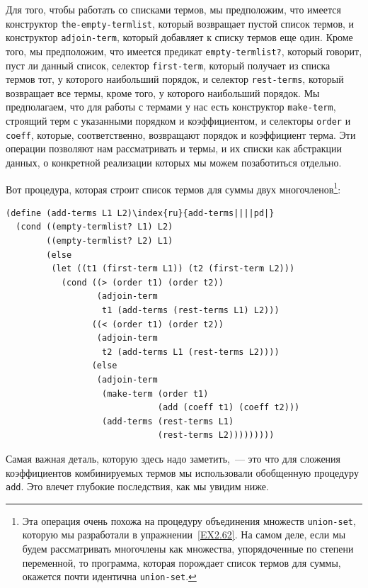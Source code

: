 Для того, чтобы работать со списками термов, мы
предположим, что имеется конструктор {\tt the-empty-termlist},
который возвращает пустой список термов, и конструктор
{\tt adjoin-term}, который добавляет к списку термов еще один.
Кроме того, мы предположим, что имеется предикат {\tt empty-termlist?},
который говорит, пуст ли данный список,
селектор {\tt first-term}, 
который получает из списка термов
тот, у которого наибольший порядок, и селектор
{\tt rest-terms}, 
который возвращает все термы, кроме того, у
которого наибольший порядок.  Мы предполагаем, что для работы с термами
у нас есть конструктор {\tt make-term}, 
строящий терм с
указанными порядком и коэффициентом, и селекторы {\tt order} 
и {\tt coeff}, 
которые, соответственно, возвращают порядок и
коэффициент терма.  Эти операции позволяют нам рассматривать и термы,
и их списки как абстракции данных, о конкретной реализации которых мы
можем позаботиться отдельно.

Вот процедура, которая строит список термов для суммы
двух многочленов\footnote{Эта операция очень похожа на процедуру
объединения множеств {\tt union-set}, которую мы разработали в
упражнении~\ref{EX2.62}.  На самом деле, если мы будем
рассматривать многочлены как множества, упорядоченные по степени
переменной, то программа, которая порождает список термов для суммы,
окажется почти идентична {\tt union-set}.}:

\begin{Verbatim}[fontsize=\small]
(define (add-terms L1 L2)\index{ru}{add-terms||||pd|}
  (cond ((empty-termlist? L1) L2)
        ((empty-termlist? L2) L1)
        (else
         (let ((t1 (first-term L1)) (t2 (first-term L2)))
           (cond ((> (order t1) (order t2))
                  (adjoin-term
                   t1 (add-terms (rest-terms L1) L2)))
                 ((< (order t1) (order t2))
                  (adjoin-term
                   t2 (add-terms L1 (rest-terms L2))))
                 (else
                  (adjoin-term
                   (make-term (order t1)
                              (add (coeff t1) (coeff t2)))
                   (add-terms (rest-terms L1)
                              (rest-terms L2)))))))))
\end{Verbatim}
Самая важная деталь, которую здесь надо заметить,~--- это что для
сложения коэффициентов комбинируемых термов мы использовали
обобщенную процедуру {\tt add}.  Это влечет глубокие
последствия, как мы увидим ниже.

